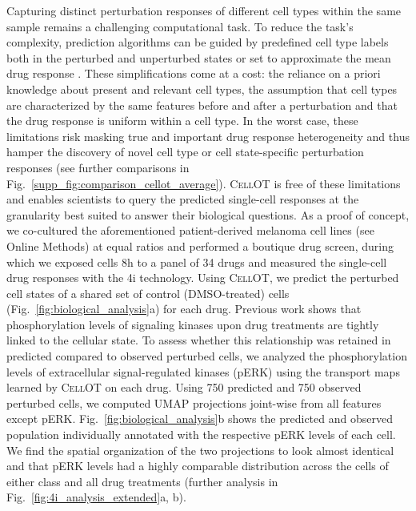  Capturing distinct perturbation responses of different cell types within the same sample remains a challenging computational task. To reduce the task's complexity, prediction algorithms can be guided by predefined cell type labels both in the perturbed and unperturbed states \citep{chen2020dissecting} or set to approximate the mean drug response \citep{lotfollahi2019scgen}.  These simplifications come at a cost: the reliance on a priori knowledge about present and relevant cell types, the assumption that cell types are characterized by the same features before and after a perturbation and that the drug response is uniform within a cell type.
In the worst case, these limitations risk masking true and important drug response heterogeneity  and thus hamper the discovery of novel cell type or cell state-specific perturbation responses (see further comparisons in Fig.~\ref{supp_fig:comparison_cellot_average}).
\textsc{CellOT} is free of these limitations and enables scientists to query the predicted single-cell responses at the granularity best suited to answer their biological questions. As a proof of concept, we co-cultured the aforementioned patient-derived melanoma cell lines (see Online Methods) at equal ratios and performed a boutique drug screen, during which we exposed cells 8h to a panel of 34 drugs and measured the single-cell drug responses with the 4i technology. 
Using \textsc{CellOT}, 
we predict the perturbed cell states of a shared set of control (DMSO-treated) cells (Fig.~\ref{fig:biological_analysis}a) for each drug.
Previous work \citep{kramer2019cellular} shows that phosphorylation levels of signaling kinases upon drug treatments are tightly linked to the cellular state. 
To assess whether this relationship was retained in predicted compared to observed perturbed cells, we analyzed the phosphorylation levels of extracellular signal-regulated kinases (pERK) using the transport maps learned by \textsc{CellOT} on each drug.
Using 750 predicted and 750 observed perturbed cells, we computed UMAP projections joint-wise from all features except pERK. Fig.~\ref{fig:biological_analysis}b shows the predicted and observed population individually annotated with the respective pERK levels of each cell. We find the spatial organization of the two projections to look almost identical and that pERK levels had a highly comparable distribution across the cells of either class and all drug treatments (further analysis in Fig.~\ref{fig:4i_analysis_extended}a, b).

